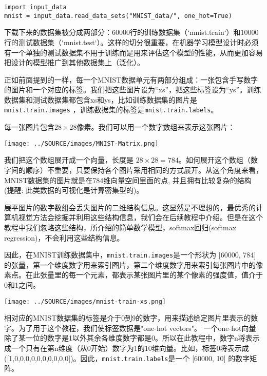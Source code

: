 \begin{lstlisting}
import input_data
mnist = input_data.read_data_sets("MNIST_data/", one_hot=True)
\end{lstlisting}

下载下来的数据集被分成两部分：60000行的训练数据集（`mnist.train`）和10000行的测试数据集（`mnist.test`）。这样的切分很重要，在机器学习模型设计时必须有一个单独的测试数据集不用于训练而是用来评估这个模型的性能，从而更加容易把设计的模型推广到其他数据集上（泛化）。

正如前面提到的一样，每一个MNIST数据单元有两部分组成：一张包含手写数字的图片和一个对应的标签。我们把这些图片设为“xs”，把这些标签设为“ys”。训练数据集和测试数据集都包含xs和ys，比如训练数据集的图片是\lstinline{mnist.train.images} ，训练数据集的标签是\lstinline{mnist.train.labels}。

每一张图片包含$ 28 \times 28$像素。我们可以用一个数字数组来表示这张图片：

\begin{center}
\texttt{[image: ../SOURCE/images/MNIST-Matrix.png]}
\end{center}

我们把这个数组展开成一个向量，长度是 $ 28 \times 28 = 784$。如何展开这个数组（数字间的顺序）不重要，只要保持各个图片采用相同的方式展开。从这个角度来看，MNIST数据集的图片就是在784维向量空间里面的点, 并且拥有比较复杂的结构 (提醒: 此类数据的可视化是计算密集型的)。

展平图片的数字数组会丢失图片的二维结构信息。这显然是不理想的，最优秀的计算机视觉方法会挖掘并利用这些结构信息，我们会在后续教程中介绍。但是在这个教程中我们忽略这些结构，所介绍的简单数学模型，softmax回归(softmax regression)，不会利用这些结构信息。

因此，在MNIST训练数据集中，\lstinline{mnist.train.images}是一个形状为 [60000, 784] 的张量，第一个维度数字用来索引图片，第二个维度数字用来索引每张图片中的像素点。在此张量里的每一个元素，都表示某张图片里的某个像素的强度值，值介于0和1之间。

\begin{center}
\texttt{[image: ../SOURCE/images/mnist-train-xs.png]}
\end{center}

相对应的MNIST数据集的标签是介于0到9的数字，用来描述给定图片里表示的数字。为了用于这个教程，我们使标签数据是"one-hot vectors"。 一个one-hot向量除了某一位的数字是1以外其余各维度数字都是0。所以在此教程中，数字n将表示成一个只有在第n维度（从0开始）数字为1的10维向量。比如，标签0将表示成([1,0,0,0,0,0,0,0,0,0,0])。因此，\lstinline{mnist.train.labels}是一个 [60000, 10] 的数字矩阵。

